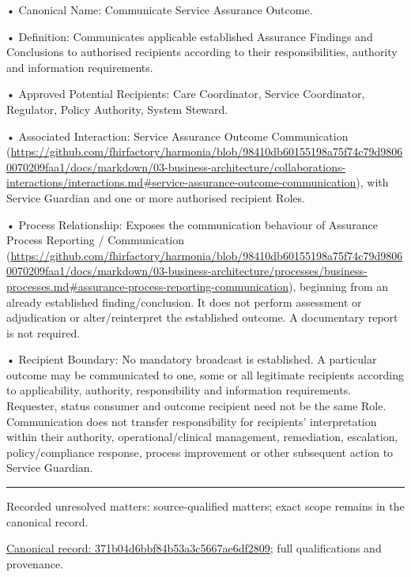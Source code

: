 •
Canonical Name: Communicate Service Assurance Outcome.



•
Definition: Communicates applicable established Assurance Findings and Conclusions to authorised recipients according to their responsibilities, authority and information requirements.



•
Approved Potential Recipients: Care Coordinator, Service Coordinator, Regulator, Policy Authority, System Steward.



•
Associated Interaction: Service Assurance Outcome Communication (\url{https://github.com/fhirfactory/harmonia/blob/98410db60155198a75f74c79d98060070209faa1/docs/markdown/03-business-architecture/collaborations-interactions/interactions.md#service-assurance-outcome-communication}), with Service Guardian and one or more authorised recipient Roles.



•
Process Relationship: Exposes the communication behaviour of Assurance Process Reporting / Communication (\url{https://github.com/fhirfactory/harmonia/blob/98410db60155198a75f74c79d98060070209faa1/docs/markdown/03-business-architecture/processes/business-processes.md#assurance-process-reporting-communication}), beginning from an already established finding/conclusion. It does not perform assessment or adjudication or alter/reinterpret the established outcome. A documentary report is not required.



•
Recipient Boundary: No mandatory broadcast is established. A particular outcome may be communicated to one, some or all legitimate recipients according to applicability, authority, responsibility and information requirements. Requester, status consumer and outcome recipient need not be the same Role. Communication does not transfer responsibility for recipients' interpretation within their authority, operational/clinical management, remediation, escalation, policy/compliance response, process improvement or other subsequent action to Service Guardian.



\medskip\hrule\medskip

{\small Recorded unresolved matters: source-qualified matters; exact scope remains in the canonical record.}\par
{\footnotesize \href{../../../../../../../continuum/business/business-service/371b04d6bbf84b53a3c5667ae6df2809.md}{Canonical record: 371b04d6bbf84b53a3c5667ae6df2809}; full qualifications and provenance.}\par
